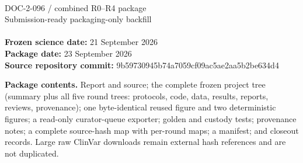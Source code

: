 \documentclass[10pt]{article}
\begin{document}
\begin{center}\\[8pt]{\Large DOC-2-096 / combined R0--R4 package}\\[16pt]{\large Submission-ready packaging-only backfill}\\[22pt]\\[28pt]\textbf{Frozen science date:} 21 September 2026\\\textbf{Package date:} 23 September 2026\\\textbf{Source repository commit:} 9b59730945b74a7059cf09ac5ae2aa5b2be634d4\end{center}
\vfill\textbf{Package contents.} Report and source; the complete frozen project tree (summary plus all five round trees: protocols, code, data, results, reports, reviews, provenance); one byte-identical reused figure and two deterministic figures; a read-only curator-queue exporter; golden and custody tests; provenance notes; a complete source-hash map with per-round maps; a manifest; and closeout records. Large raw ClinVar downloads remain external hash references and are not duplicated.\newpage
\end{document}
